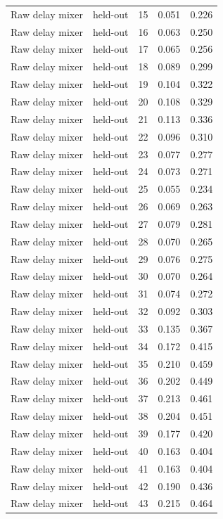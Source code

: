 \begin{tabular}{llrrr}
Raw delay mixer & held-out & 15 & 0.051 & 0.226 \\
Raw delay mixer & held-out & 16 & 0.063 & 0.250 \\
Raw delay mixer & held-out & 17 & 0.065 & 0.256 \\
Raw delay mixer & held-out & 18 & 0.089 & 0.299 \\
Raw delay mixer & held-out & 19 & 0.104 & 0.322 \\
Raw delay mixer & held-out & 20 & 0.108 & 0.329 \\
Raw delay mixer & held-out & 21 & 0.113 & 0.336 \\
Raw delay mixer & held-out & 22 & 0.096 & 0.310 \\
Raw delay mixer & held-out & 23 & 0.077 & 0.277 \\
Raw delay mixer & held-out & 24 & 0.073 & 0.271 \\
Raw delay mixer & held-out & 25 & 0.055 & 0.234 \\
Raw delay mixer & held-out & 26 & 0.069 & 0.263 \\
Raw delay mixer & held-out & 27 & 0.079 & 0.281 \\
Raw delay mixer & held-out & 28 & 0.070 & 0.265 \\
Raw delay mixer & held-out & 29 & 0.076 & 0.275 \\
Raw delay mixer & held-out & 30 & 0.070 & 0.264 \\
Raw delay mixer & held-out & 31 & 0.074 & 0.272 \\
Raw delay mixer & held-out & 32 & 0.092 & 0.303 \\
Raw delay mixer & held-out & 33 & 0.135 & 0.367 \\
Raw delay mixer & held-out & 34 & 0.172 & 0.415 \\
Raw delay mixer & held-out & 35 & 0.210 & 0.459 \\
Raw delay mixer & held-out & 36 & 0.202 & 0.449 \\
Raw delay mixer & held-out & 37 & 0.213 & 0.461 \\
Raw delay mixer & held-out & 38 & 0.204 & 0.451 \\
Raw delay mixer & held-out & 39 & 0.177 & 0.420 \\
Raw delay mixer & held-out & 40 & 0.163 & 0.404 \\
Raw delay mixer & held-out & 41 & 0.163 & 0.404 \\
Raw delay mixer & held-out & 42 & 0.190 & 0.436 \\
Raw delay mixer & held-out & 43 & 0.215 & 0.464 \\

\end{tabular}
